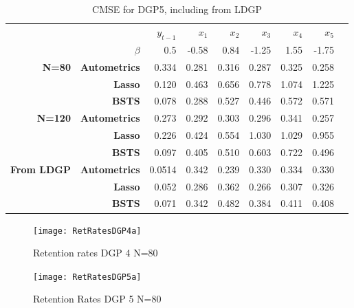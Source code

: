 \documentclass[11pt, oneside]{book}   	%
\begin{document}
\begin{table}[htbp]
  \centering

    \begin{tabular}{rrrrrrrrr}

          &       & $y_{t-1}$ & $x_{1}$ & $x_{2}$ & $x_{3}$ & $x_{4}$ & $x_{5}$ &  \\

         & $\beta$ &   0.5 & -0.58 &0.84 &-1.25 &  1.55 & -1.75  \\
    \textbf{N=80} & \textbf{Autometrics} & 0.334 & 0.281 & 0.316 & 0.287 & 0.325 & 0.258 &  \\
    \textbf{} & \textbf{Lasso} & 0.120 & 0.463 & 0.656 & 0.778 & 1.074 & 1.225 &  \\
    \textbf{} & \textbf{BSTS} & 0.078 & 0.288 & 0.527 & 0.446 & 0.572 & 0.571 &  \\
    \textbf{N=120} & \textbf{Autometrics} & 0.273 & 0.292 & 0.303 & 0.296 & 0.341 & 0.257 &  \\
    \textbf{} & \textbf{Lasso} & 0.226 & 0.424 & 0.554 & 1.030 & 1.029 & 0.955 &  \\
    \textbf{} & \textbf{BSTS} & 0.097 & 0.405 & 0.510 & 0.603 & 0.722 & 0.496 &  \\
    \textbf{From LDGP} & \textbf{Autometrics} & 0.0514 & 0.342 & 0.239 & 0.330 & 0.334 & 0.330 &  \\
          & \textbf{Lasso} & 0.052 & 0.286 & 0.362 & 0.266 & 0.307 & 0.326 &  \\
          & \textbf{BSTS} & 0.071 & 0.342 & 0.482 & 0.384 & 0.411 & 0.408 &  \\

    \end{tabular}%
      \caption{CMSE for DGP5, including from LDGP}
  \label{LDGP5CMSE}%
\end{table}%






\begin{figure}[h]

\begin{minipage}{.5\textwidth}
\centering
\texttt{[image: RetRatesDGP4a]}
\caption{Retention rates DGP 4 \newline N=80}
\label{fig:RetRatesDGP4a}
\end{minipage}%
\begin{minipage}{.5\textwidth}
\centering
\texttt{[image: RetRatesDGP5a]}
\caption{Retention Rates DGP 5 \newline N=80}
\label{fig:RetRatesDGP5a}

\end{minipage}

\end{figure}
\end{document}
